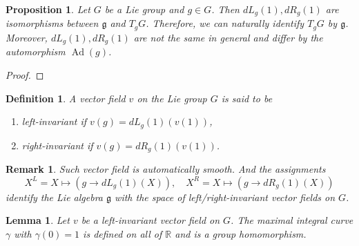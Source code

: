 \documentclass{article}
\newtheorem{proposition}{Proposition}[section]
\newtheorem{definition}{Definition}[section]
\newtheorem{lemma}{Lemma}[section]
\newtheorem{remark}{Remark}[section]
\numberwithin{equation}{section}
\DeclareMathOperator{\Ad}{Ad}
\begin{document}
\begin{proposition}
Let $G$ be a Lie group and $g\in G$. Then $dL_g(1),dR_g(1)$ are isomorphisms between $\mathfrak{g}$ and $T_gG$. Therefore, we can naturally identify $T_gG$ by $\mathfrak{g}$. Moreover, $dL_g(1),dR_g(1)$ are not the same in general and differ by the automorphism $\Ad(g)$.
\end{proposition}

\begin{proof}
\end{proof}

\begin{definition}
A vector field $v$ on the Lie group $G$ is said to be
\begin{enumerate}[1).]
\item left-invariant if $v(g) = dL_g(1)(v(1))$,
\item right-invariant if $v(g) = dR_g(1)(v(1))$.
\end{enumerate}
\end{definition}

\begin{remark}
Such vector field is automatically smooth. And the assignments 
\begin{equation*}
X^L=X\mapsto(g\to dL_g(1)(X)), \quad X^R= X\mapsto(g\to dR_g(1)(X))
\end{equation*}
identify the Lie algebra $\mathfrak{g}$ with the space of left/right-invariant vector fields on $G$.
\end{remark}

\begin{lemma}
Let $v$ be a left-invariant vector field on $G$. The maximal integral curve $\gamma$ with $\gamma(0)=1$ is defined on all of $\mathbb{R}$ and is a group homomorphism.
\label{max_int_curve}
\end{lemma}
\end{document}
